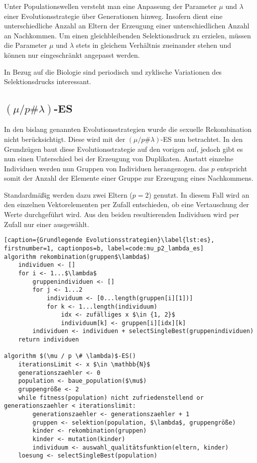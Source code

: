 Unter Populationswellen versteht man eine Anpassung der Parameter $\mu$ und $\lambda$ einer Evolutionsstrategie über Generationen hinweg. Insofern dient eine unterschiedliche Anzahl an Eltern der Erzeugung einer unterschiedlichen Anzahl an Nachkommen.
Um einen gleichbleibenden Selektionsdruck zu erzielen, müssen die Parameter $\mu$ und $\lambda$ stets in gleichem Verhältnis zueinander stehen und können nur eingeschränkt angepasst werden.

In Bezug auf die Biologie sind periodisch und zyklische Variationen des Selektionsdrucks interessant.

\subsection{$(\mu / p \# \lambda)$-ES}

In den bislang genannten Evolutionsstrategien wurde die sexuelle Rekombination nicht berücksichtigt.
Diese wird mit der $(\mu / p \# \lambda)$-ES nun betrachtet.
In den Grundzügen baut diese Evolutionsstrategie auf den vorigen auf, jedoch gibt es nun einen Unterschied bei der Erzeugung von Duplikaten.
Anstatt einzelne Individuen werden nun Gruppen von Individuen herangezogen.
das $p$ entspricht somit der Anzahl der Elemente einer Gruppe zur Erzeugung eines Nachkommens.

Standardmäßig werden dazu zwei Eltern ($p = 2$) genutzt.
In diesem Fall wird an den einzelnen Vektorelementen per Zufall entschieden, ob eine Vertauschung der Werte durchgeführt wird.
Aus den beiden resultierenden Individuen wird per Zufall nur einer ausgewählt.

\begin{lstlisting}[caption={Grundlegende Evolutionsstrategien}\label{lst:es}, firstnumber=1, captionpos=b, label=code:mu_p2_lambda_es]
algorithm rekombination(gruppen$\lambda$)
	individuen <- []
	for i <- 1...$\lambda$
		gruppenindividuen <- []
		for j <- 1...2
			individuum <- [0...length(gruppen[i][1])]
			for k <- 1...length(individuum)
				idx <- zufälliges x $\in {1, 2}$
				individuum[k] <- gruppen[i][idx][k]
		individuen <- individuen + selectSingleBest(gruppenindividuen)
	return individuen

algorithm $(\mu / p \# \lambda)$-ES()
	iterationsLimit <- x $\in \mathbb{N}$
	generationszaehler <- 0
	population <- baue_population($\mu$)
	gruppengröße <- 2
	while fitness(population) nicht zufriedenstellend or generationszaehler < iterationslimit:
		generationszaehler <- generationszaehler + 1
		gruppen <- selektion(population, $\lambda$, gruppengröße)
		kinder <- rekombination(gruppen)
		kinder <- mutation(kinder)
		individuum <- auswahl_qualitätsfunktion(eltern, kinder)
	loesung <- selectSingleBest(population)
\end{lstlisting}


